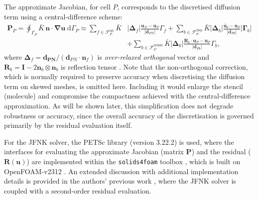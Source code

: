 \documentclass[sn-mathphys,Numbered]{sn-jnl}%
\newcommand{\bb}{\boldsymbol}
\begin{document}
The approximate Jacobian, for cell $P$, corresponds to the discretised diffusion term using a central-difference scheme:
%
\begin{equation}
\begin{split}
 	\bb{P}_P = \oint_{\Gamma_P} \bar{K} \, \bb{n} \cdot \bb{\nabla} \bb{u} \; \text{d}\Gamma_P \approx
 		\sum_{f \in \mathcal{F}^{\text{int}}_P}  \bar{K} &
 		\left|\bb{\Delta}_{f} \right| \frac{ \bb{u}_{N} - \bb{u}_P}{\left|\bb{d}_{PN}\right|}    \Gamma_{f}
 	+  \sum_{b \in \mathcal{F}^{\text{disp}}_P}  \bar{K} 
 		\left|\bb{\Delta}_{b} \right| \frac{ \bar{\bb{u}}_{b}  - \bb{u}_P}{\left|\bb{d}_{Pb}\right|} 
 		\left|\bb{\Gamma}_{b}\right|    \\
 	&	+ \sum_{b \in \mathcal{F}^{\text{symm}}_P}  \bar{K}
 		\left|\bb{\Delta}_{b} \right| \frac{ \bb{R}_{b} \cdot \bb{u}_{P} - \bb{u}_P}{\left|\bb{d}_{Pb}\right|} {\Gamma}_{b},
\end{split}
\end{equation}
%
where $\bb{\Delta}_{f}=\bb{d_{PN}}/(\bb{d}_{PN} \cdot \bb{n}_f)$ is \emph{over-relaxed orthogonal} vector \cite{Demirdzic2015} and $\bb{R}_b=\mathbf{I}-2\bb{n}_b \otimes\bb{n}_b$ is reflection tensor \cite{Demirdzic2022}.
Note that the non-orthogonal correction, which is normally required to preserve accuracy when discretising the diffusion term on skewed meshes, is omitted here.
Including it would enlarge the stencil (molecule) and compromise the compactness achieved with the central-difference approximation.
As will be shown later, this simplification does not degrade robustness or accuracy, since the overall accuracy of the discretisation is governed primarily by the residual evaluation itself. 

For the JFNK solver, the PETSc library (version 3.22.2) \cite{PETSc} is used, where the interfaces for evaluating the approximate Jacobian (matrix $\bb{P}$) and the residual ($\boldsymbol{R}(\bb{u})$) are implemented within the \texttt{solids4foam} toolbox \cite{Cardiff2018, Tukovic2018}, which is built on OpenFOAM-v2312 \cite{Weller1998}.
An extended discussion with additional implementation details is provided in the authors’ previous work \cite{Cardiff2025}, where the JFNK solver is coupled with a second-order residual evaluation.
%
%        
\end{document}

